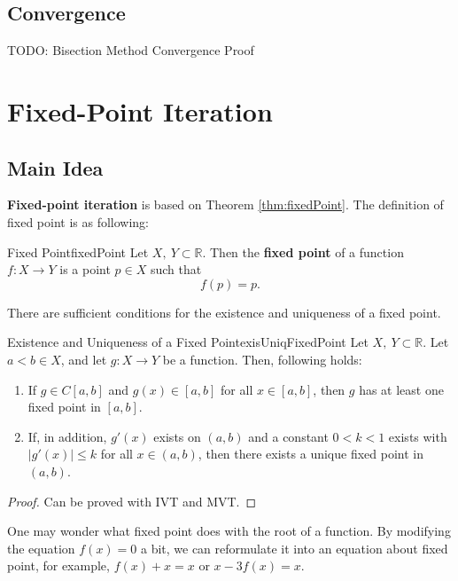     \subsection{Convergence}
            TODO: Bisection Method Convergence Proof

\section{Fixed-Point Iteration}
    \subsection{Main Idea}
        \textbf{Fixed-point iteration} is based on Theorem \ref{thm:fixedPoint}. The definition of fixed point is as following:
        \begin{defn}{Fixed Point}{fixedPoint}
            Let $X,\ Y \subset \mathbb{R}$. Then the \textbf{fixed point} of a function $f:X \to Y$ is a point $p \in X$ such that
            \begin{equation}
                f(p)=p.
            \end{equation}
        \end{defn}
        There are sufficient conditions for the existence and uniqueness of a fixed point.
        \begin{thm}{Existence and Uniqueness of a Fixed Point}{exisUniqFixedPoint}
            Let $X,\ Y \subset \mathbb{R}$. Let $a < b \in X$, and let $g:X\to Y$ be a function.
            Then, following holds:
            \begin{enumerate}
                \item If $g \in C[a,b]$ and $g(x) \in [a,b]$ for all $x \in [a,b]$, then $g$ has at least one fixed point in $[a,b]$.
                \item If, in addition, $g'(x)$ exists on $(a,b)$ and a constant $0 < k < 1$ exists with $|g'(x)| \leq k$ for all $x \in (a,b)$,
                    then there exists a unique fixed point in $(a,b)$.
            \end{enumerate}
        \end{thm}
        \begin{proof}
            Can be proved with IVT and MVT.
        \end{proof}
        One may wonder what fixed point does with the root of a function. By modifying the equation $f(x)=0$ a bit,
        we can reformulate it into an equation about fixed point, for example, $f(x) + x = x$ or $x - 3f(x) = x$.

